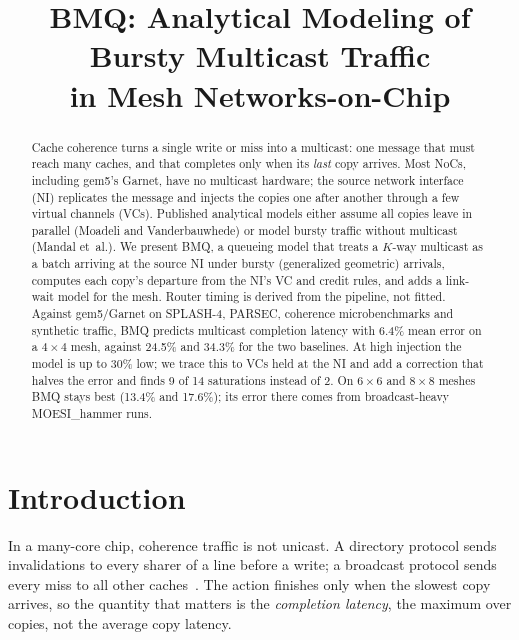 \documentclass[conference]{IEEEtran}
\begin{document}
\title{BMQ: Analytical Modeling of Bursty Multicast Traffic\\in Mesh Networks-on-Chip}

\author{
\and
{}
\and
{}
}

\maketitle

\begin{abstract}
Cache coherence turns a single write or miss into a multicast: one message that must reach many caches, and that completes only when its \emph{last} copy arrives. Most NoCs, including gem5's Garnet, have no multicast hardware; the source network interface (NI) replicates the message and injects the copies one after another through a few virtual channels (VCs). Published analytical models either assume all copies leave in parallel (Moadeli and Vanderbauwhede) or model bursty traffic without multicast (Mandal et~al.). We present BMQ, a queueing model that treats a $K$-way multicast as a batch arriving at the source NI under bursty (generalized geometric) arrivals, computes each copy's departure from the NI's VC and credit rules, and adds a link-wait model for the mesh. Router timing is derived from the pipeline, not fitted. Against gem5/Garnet on SPLASH-4, PARSEC, coherence microbenchmarks and synthetic traffic, BMQ predicts multicast completion latency with 6.4\% mean error on a $4{\times}4$ mesh, against 24.5\% and 34.3\% for the two baselines. At high injection the model is up to 30\% low; we trace this to VCs held at the NI and add a correction that halves the error and finds 9 of 14 saturations instead of 2. On $6{\times}6$ and $8{\times}8$ meshes BMQ stays best (13.4\% and 17.6\%); its error there comes from broadcast-heavy MOESI\_hammer runs.
\end{abstract}

\section{Introduction}
In a many-core chip, coherence traffic is not unicast. A directory protocol sends invalidations to every sharer of a line before a write; a broadcast protocol sends every miss to all other caches~\cite{sorin2011primer}. The action finishes only when the slowest copy arrives, so the quantity that matters is the \emph{completion latency}, the maximum over copies, not the average copy latency.
\end{document}
